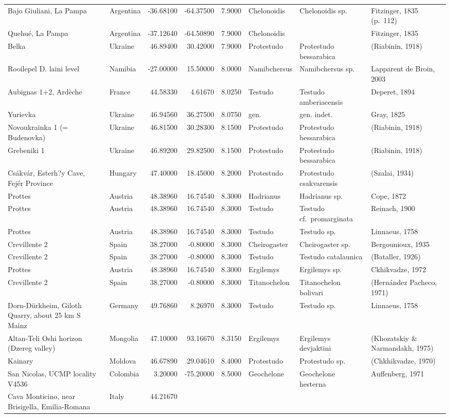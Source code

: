 \documentclass[]{article}
\begin{document}
\begin{longtable}[]{@{}llrrrlll@{}}
Bajo Giuliani, La Pampa & Argentina & -36.68100 & -64.37500 & 7.9000 &
Chelonoidis & Chelonoidis sp. & Fitzinger, 1835 (p.~112)\tabularnewline
Quehué, La Pampa & Argentina & -37.12640 & -64.50890 & 7.9000 &
Chelonoidis & & Fitzinger, 1835\tabularnewline
Belka & Ukraine & 46.89400 & 30.42000 & 7.9000 & Protestudo & Protestudo
bessarabica & (Riabinin, 1918)\tabularnewline
Rooilepel D. laini level & Namibia & -27.00000 & 15.50000 & 8.0000 &
Namibchersus & Namibchersus sp. & Lapparent de Broin,
2003\tabularnewline
Aubignas 1+2, Ardèche & France & 44.58330 & 4.61670 & 8.0250 & Testudo &
Testudo amberiacensis & Deperet, 1894\tabularnewline
Yurievka & Ukraine & 46.94560 & 36.27500 & 8.0750 & gen. & gen. indet. &
Gray, 1825\tabularnewline
Novoukrainka 1 (= Budenovka) & Ukraine & 46.81500 & 30.28300 & 8.1500 &
Protestudo & Protestudo bessarabica & (Riabinin, 1918)\tabularnewline
Grebeniki 1 & Ukraine & 46.89200 & 29.82500 & 8.1500 & Protestudo &
Protestudo bessarabica & (Riabinin, 1918)\tabularnewline
Csákvár, Esterh?y Cave, Fejér Province & Hungary & 47.40000 & 18.45000 &
8.2000 & Protestudo & Protestudo csakvarensis & (Szalai,
1934)\tabularnewline
Prottes & Austria & 48.38960 & 16.74540 & 8.3000 & Hadrianus & Hadrianus
sp. & Cope, 1872\tabularnewline
Prottes & Austria & 48.38960 & 16.74540 & 8.3000 & Testudo & Testudo
cf.~promarginata & Reinach, 1900\tabularnewline
Prottes & Austria & 48.38960 & 16.74540 & 8.3000 & Testudo & Testudo sp.
& Linnaeus, 1758\tabularnewline
Crevillente 2 & Spain & 38.27000 & -0.80000 & 8.3000 & Cheirogaster &
Cheirogaster sp. & Bergounioux, 1935\tabularnewline
Crevillente 2 & Spain & 38.27000 & -0.80000 & 8.3000 & Testudo & Testudo
catalaunica & (Bataller, 1926)\tabularnewline
Prottes & Austria & 48.38960 & 16.74540 & 8.3000 & Ergilemys & Ergilemys
sp. & Ckhikvadze, 1972\tabularnewline
Crevillente 2 & Spain & 38.27000 & -0.80000 & 8.3000 & Titanochelon &
Titanochelon bolivari & (Hernández Pacheco, 1971)\tabularnewline
Dorn-Dürkheim, Giloth Quarry, about 25 km S Mainz & Germany & 49.76860 &
8.26970 & 8.3000 & Testudo & Testudo sp. & Linnaeus, 1758\tabularnewline
Altan-Teli Oshi horizon (Dzereg valley) & Mongolia & 47.10000 & 93.16670
& 8.3150 & Ergilemys & Ergilemys devjaktini & (Khozatskiy \& Narmandakh,
1975)\tabularnewline
Kainary & Moldova & 46.67890 & 29.04610 & 8.4000 & Protestudo &
Protestudo sp. & (Chkhikvadze, 1970)\tabularnewline
San Nicolas, UCMP locality V4536 & Colombia & 3.20000 & -75.20000 &
8.5000 & Geochelone & Geochelone hesterna & Auffenberg,
1971\tabularnewline
Cava Monticino, near Brisigella, Emilia-Romana & Italy & 44.21670 &

\end{longtable}
\end{document}
